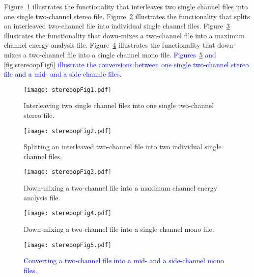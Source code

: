 Figure~\ref{fig:stereoopFig1} illustrates the functionality that
interleaves two single channel files into one single two-channel
stereo file. Figure~\ref{fig:stereoopFig2} illustrates the
functionality that splits an interleaved two-channel file into
individual single channel files. Figure~\ref{fig:stereoopFig3}
illustrates the functionality that down-mixes a two-channel file into
a maximum channel energy analysis file. Figure~\ref{fig:stereoopFig4}
illustrates the functionality that down-mixes a two-channel file into
a single channel mono
file. \textcolor{blue}{Figures~\ref{fig:stereoopFig5} and \ref{fig:stereoopFig6}
illustrate the conversions between one single two-channel stereo file
and a mid- and a side-channle files.}

\begin{figure}[htp]
    \begin{center}
        \texttt{[image: stereoopFig1.pdf]}
  \end{center}
  \caption{Interleaving two single channel files into one single two-channel stereo file.
           \label{fig:stereoopFig1} }
\end{figure}

\begin{figure}[htp]
    \begin{center}
        \texttt{[image: stereoopFig2.pdf]}
  \end{center}
  \caption{Splitting an interleaved two-channel file into two individual single channel files.
           \label{fig:stereoopFig2} }
\end{figure}

\begin{figure}[htp]
    \begin{center}
        \texttt{[image: stereoopFig3.pdf]}
  \end{center}
  \caption{Down-mixing a two-channel file into a maximum channel energy analysis file.
           \label{fig:stereoopFig3} }
\end{figure}

\begin{figure}[htp]
    \begin{center}
        \texttt{[image: stereoopFig4.pdf]}
  \end{center}
  \caption{Down-mixing a two-channel file into a single channel mono file.
           \label{fig:stereoopFig4} }
\end{figure}

\begin{figure}[htp]
    \begin{center}
        \texttt{[image: stereoopFig5.pdf]}
  \end{center}
  \caption{\textcolor{blue}{%
      Converting a two-channel file into a mid- and a side-channel mono files.}
           \label{fig:stereoopFig5} }
\end{figure}

